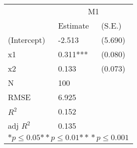 \begin{tabular}{*{3}{l}}
\hline
                  & \multicolumn{2}{c}{M1}   \tabularnewline
                   &Estimate  &(S.E.)  \tabularnewline
 \hline
 \hline
   (Intercept)     &-2.513   &   (5.690) \tabularnewline
   x1              &0.311***   &   (0.080) \tabularnewline
   x2              &0.133   &   (0.073) \tabularnewline
 \hline
 N                 &100       &        \tabularnewline
 RMSE             &6.925         & \tabularnewline
 $R^2$             &0.152         & \tabularnewline
 adj $R^2$         &0.135         & \tabularnewline
 \hline
\hline
 
 \multicolumn{3}{c}{${*  p}\le 0.05$${*\!\!*  p}\le 0.01$${*\!\!*\!\!*  p}\le 0.001$}\tabularnewline
 \end{tabular}